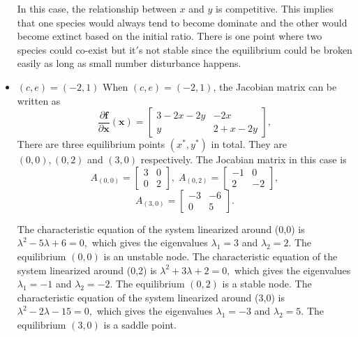 \documentclass[a4paper,twocolumn]{article} %
\begin{document}
\begin{itemize}
In this case, the relationship between $x$ and $y$ is competitive. This implies that one species would always tend to become dominate and the other would become extinct based on the initial ratio. There is one point where two species could co-exist but it$'$s not stable since the equilibrium could be broken easily as long as small number disturbance happens.  

\item $(c,e)=(-2,1)$
When $(c,e)=(-2,1)$, the Jacobian matrix can be written as
\begin{equation*}
    \frac{\partial\textbf{f}}{\partial \textbf{x}}(\textbf{x}) =
    \left[\begin{array}{cc}
    3-2x-2y & -2x \\
    y & 2+x-2y
    \end{array}\right],
\end{equation*}
There are three equilibrium points $(x^*,y^*)$ in total. They are $(0,0),(0,2)$ and $(3,0)$ respectively. The Jocabian matrix in this case is
\begin{equation*}
    A_{(0,0)} =
    \left[\begin{array}{cc}
    3 & 0 \\
    0 & 2
    \end{array}\right], \; A_{(0,2)} =
    \left[\begin{array}{cc}
    -1 & 0 \\
    2 & -2
    \end{array}\right],   
    \end{equation*}
    \begin{equation*}
    A_{(3,0)} =
    \left[\begin{array}{cc}
    -3 & -6 \\
    0 & 5
    \end{array}\right].
\end{equation*}

The characteristic equation of the system linearized around \mbox{(0,0)} is
$\lambda^2 -5 \lambda + 6 = 0,$ which gives the eigenvalues $\lambda_{1} = 3$ and $\lambda_{2} = 2$. The equilibrium $(0,0)$ is an unstable node. 
The characteristic equation of the system linearized around \mbox{(0,2)} is $\lambda^2 +3 \lambda + 2 = 0,$ which gives the eigenvalues $\lambda_1 = -1$ and $\lambda_2 = -2$. The equilibrium $(0,2)$ is a stable node. 
The characteristic equation of the system linearized around \mbox{(3,0)} is $\lambda^2 -2 \lambda - 15 = 0,$ which gives the eigenvalues $\lambda_1 = -3$ and $\lambda_2 = 5$. The equilibrium $(3,0)$ is a saddle point.


\end{itemize}
\end{document}
